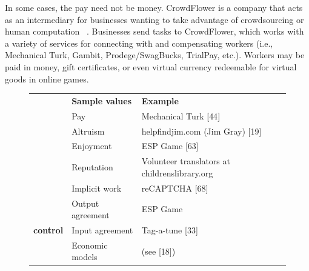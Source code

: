 \documentclass{acm_proc_article-sp}
\begin{document}
In some cases, the pay need not be money. CrowdFlower is a company that acts as an intermediary for businesses wanting to take advantage of crowdsourcing or human computation ~\cite{biewald2011}. Businesses send tasks to CrowdFlower, which works with a variety of services for connecting with and compensating workers (i.e., Mechanical Turk, Gambit, Prodege/SwagBucks, TrialPay, etc.). Workers may be paid in money, gift certificates, or even virtual currency redeemable for virtual goods in online games.
\begin{figure}[t]
\centering
\begin{tabular}{|l|l|l|}
\Xhline{1mm}
\multicolumn{1}{|l|}{\textbf{Dimension}}   & \multicolumn{1}{l|}{\textbf{Sample values}}                    & \multicolumn{1}{l|}{\textbf{Example}}                              \\ \Xhline{1mm}
\multicolumn{1}{|l|}{\textbf{Motivation}}  & \multicolumn{1}{l|}{Pay}                                       & \multicolumn{1}{l|}{Mechanical Turk {[}44{]}}                      \\ \cline{2-3}
\multicolumn{1}{|l|}{\textbf{}}            & \multicolumn{1}{l|}{Altruism}                                  & \multicolumn{1}{l|}{helpfindjim.com (Jim Gray) {[}19{]}}           \\ \cline{2-3}
\multicolumn{1}{|l|}{\textbf{}}            & \multicolumn{1}{l|}{Enjoyment}                                 & \multicolumn{1}{l|}{ESP Game {[}63{]}}                             \\ \cline{2-3}
\multicolumn{1}{|l|}{\textbf{}}            & \multicolumn{1}{l|}{Reputation}                                & \multicolumn{1}{l|}{Volunteer translators at childrenslibrary.org} \\  \cline{2-3}
\textbf{}                                  & Implicit work                                                  & reCAPTCHA {[}68{]}                                                 \\  \Xhline{1mm}
\multicolumn{1}{|l|}{\textbf{Quality}}     & \multicolumn{1}{l|}{Output agreement}                          & \multicolumn{1}{l|}{ESP Game}                                      \\  \cline{2-3}
\multicolumn{1}{|l|}{\textbf{control}}     & \multicolumn{1}{l|}{Input agreement}                           & \multicolumn{1}{l|}{Tag-a-tune {[}33{]}}                           \\  \cline{2-3}
\multicolumn{1}{|l|}{\textbf{}}            & \multicolumn{1}{l|}{Economic models}                           & \multicolumn{1}{l|}{(see {[}18{]})}                                \\  \cline{2-3}

\end{tabular}
\end{figure}
\end{document}
